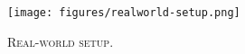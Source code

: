 
\begin{figure}
    \centering
    \texttt{[image: figures/realworld-setup.png]}
    \caption{\textsc{Real-world setup}. \label{fig:real-world-setup}}
    \vspace{-6mm}
\end{figure}